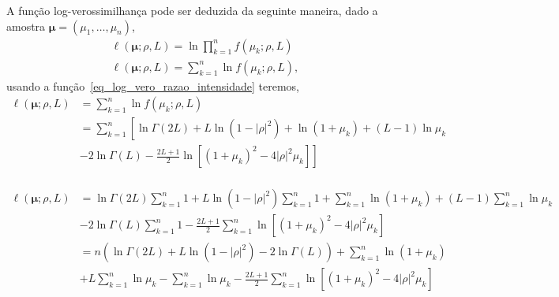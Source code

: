 A função log-verossimilhança pode ser deduzida da seguinte maneira, dado a amostra $\bm\mu = (\mu_1,\dots,\mu_n)$, 
\begin{equation}\nonumber
\begin{split}
  \ell(\bm \mu;\rho, L)=\ln\prod_{k=1}^{n}f(\mu_k;\rho,L)\\
  \ell(\bm \mu;\rho, L)=\sum_{k=1}^{n}\ln f(\mu_k;\rho,L),
 \end{split}
 \end{equation}
usando a função~\eqref{eq_log_vero_razao_intensidade} teremos,
\begin{equation}\nonumber
\begin{split}
    \ell(\bm \mu;\rho, L)&=\sum_{k=1}^{n}\ln f(\mu_k;\rho, L)\\
                         &=\sum_{k=1}^{n}\left[\ln\Gamma(2L) +L\ln(1-|\rho|^2)+\ln(1+\mu_k)+(L-1)\ln\mu_k\right.\\
                         &-\left.2\ln\Gamma(L)-\frac{2L+1}{2}\ln\left[(1+\mu_k)^2-4|\rho|^2\mu_k\right]\right]\\
 \end{split}
 \end{equation}
 
 \begin{equation}\nonumber
\begin{split} 
    \ell(\bm \mu;\rho, L)&=\ln\Gamma(2L)\sum_{k=1}^{n} 1+L\ln(1-|\rho|^2)\sum_{k=1}^{n} 1+\sum_{k=1}^{n}\ln(1+\mu_k)+(L-1)\sum_{k=1}^{n}\ln\mu_k\\
                         &-2\ln\Gamma(L)\sum_{k=1}^{n} 1-\frac{2L+1}{2}\sum_{k=1}^{n}\ln\left[(1+\mu_k)^2-4|\rho|^2\mu_k\right]\\
                         &=n\left(\ln\Gamma(2L)+L\ln(1-|\rho|^2)-2\ln\Gamma(L)\right)+\sum_{k=1}^{n}\ln(1+\mu_k)\\
                         &+L\sum_{k=1}^{n}\ln\mu_k-\sum_{k=1}^{n}\ln\mu_k-\frac{2L+1}{2}\sum_{k=1}^{n} \ln\left[(1+\mu_k)^2-4|\rho|^2\mu_k\right]\\
\end{split}
\end{equation}
 
